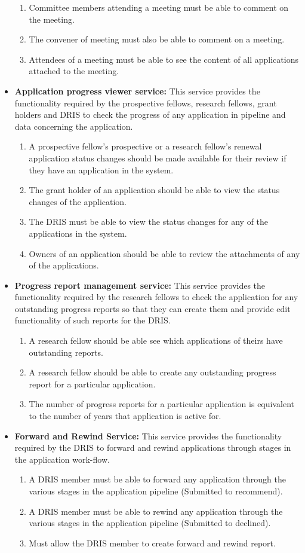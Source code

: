\documentclass[12pt]{article}
\begin{document}
\begin{itemize}
\begin{enumerate}
			\item Committee members attending a meeting must be able to comment on the meeting.  
			\item The convener of meeting must also be able to comment on a meeting.
			\item Attendees of a meeting must be able to see the content of all applications attached to the meeting.		
		\end{enumerate}	
		\item\textbf{Application progress viewer service:}
		This service provides the functionality required by the prospective fellows, research fellows, grant holders and DRIS to check the progress of any application in pipeline and data concerning the application.
		\begin{enumerate}
			\item A prospective fellow's prospective or a research fellow's renewal application status changes should be made available for their review if they have an application in the system.
			\item The grant holder of an application should be able to view the status changes of the application.
			\item The DRIS must be able to view the status changes for any of the applications in the system.
			\item Owners of an application should be able to review the attachments of any of the applications.			
		\end{enumerate}
		\item\textbf{Progress report management service:}
		This service provides the functionality required by the research fellows to check the application for any outstanding progress reports so that they can create them and provide edit functionality of such reports for the DRIS.
		\begin{enumerate}
			\item A research fellow should be able see which applications of theirs have outstanding reports. 
			\item A research fellow should be able to create any outstanding progress report for a particular application. 
			\item The number of progress reports for a particular application is equivalent to the number of years that application is active for.			
		\end{enumerate}
		\item\textbf{Forward and Rewind Service:}
		This service provides the functionality required by the DRIS to forward and rewind applications through stages in the application work-flow.
		\begin{enumerate}
			\item A DRIS member must be able to forward any application through the various stages in the application pipeline (Submitted to recommend). 
			\item A DRIS member must be able to rewind any application through the various stages in the application pipeline (Submitted to declined).  
			\item Must allow the DRIS member to create forward and rewind report.		
		\end{enumerate}		
	\end{itemize}
\newpage
\end{document}
